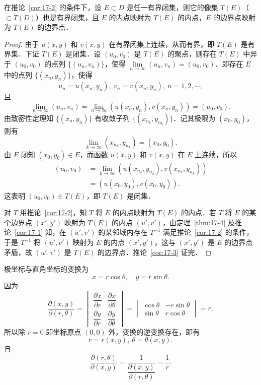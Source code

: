 \begin{corollary}\label{cor:17-3}
在推论~\ref{cor:17-2} 的条件下，设 $E\subset D$ 是任一有界闭集，则它的像集 $T(E)$（$\subset T(D)$）也是有界闭集，且 $E$ 的内点映射为 $T(E)$ 的内点，$E$ 的边界点映射为 $T(E)$ 的边界点．
\end{corollary}

\begin{proof}
由于 $u(x,y)$ 和 $v(x,y)$ 在有界闭集上连续，从而有界，即 $T(E)$ 是有界集．下证 $T(E)$ 是闭集．设 $(u_{0},v_{0})$ 是 $T(E)$ 的聚点，则存在 $T(E)$ 中异于 $(u_{0},v_{0})$ 的点列 $\{(u_{n},v_{n})\}$，使得 $\lim\limits_{n\to\infty}(u_{n},v_{n})=(u_{0},v_{0})$．即存在 $E$ 中的点列 $\{(x_{n},y_{n})\}$，使得
\[
u_{n}=u(x_{n},y_{n}),\ v_{n}=v(x_{n},y_{n}),\ n=1,2,\cdots,
\]
且
\[
\lim_{n\to\infty}(u_{n},v_{n})=\lim_{n\to\infty}\left(u(x_{n},y_{n}),v(x_{n},y_{n})\right)=(u_{0},v_{0}).
\]
由致密性定理知 $\{(x_{n},y_{n})\}$ 有收敛子列 $\{(x_{n_{k}},y_{n_{k}})\}$．记其极限为 $(x_{0},y_{0})$，则有
\[
\lim_{k\to\infty}(x_{n_{k}},y_{n_{k}})=(x_{0},y_{0}).
\]
由 $E$ 闭知 $(x_{0},y_{0})\in E$，而函数 $u(x,y)$ 和 $v(x,y)$ 在 $E$ 上连续，所以
\[
\begin{aligned}
(u_{0},v_{0})&=\lim_{k\to\infty}\left(u(x_{n_{k}},y_{n_{k}}),v(x_{n_{k}},y_{n_{k}})\right)\\
&=\left(u(x_{0},y_{0}),v(x_{0},y_{0})\right).
\end{aligned}
\]
这表明 $(u_{0},v_{0})\in T(E)$，即 $T(E)$ 是闭集．

对 $T$ 用推论~\ref{cor:17-2}，知 $T$ 将 $E$ 的内点映射为 $T(E)$ 的内点．若 $T$ 将 $E$ 的某个边界点 $(x',y')$ 映射为 $T(E)$ 的内点 $(u',v')$，由定理~\ref{thm:17-4} 及推论~\ref{cor:17-1} 知，在 $(u',v')$ 的某邻域内存在 $T^{-1}$ 满足推论~\ref{cor:17-2} 的条件，于是 $T^{-1}$ 将 $(u',v')$ 映射为 $E$ 的内点 $(x',y')$，这与 $(x',y')$ 是 $E$ 的边界点矛盾，故 $(u',v')$ 是 $T(E)$ 的边界点．推论~\ref{cor:17-3} 证完．
\end{proof}

\begin{example}\label{ex:17-2-2}
极坐标与直角坐标的变换为
\[
x=r\cos\theta,\quad y=r\sin\theta.
\]
因为
\[
\frac{\partial(x,y)}{\partial(r,\theta)}=\begin{vmatrix}\dfrac{\partial x}{\partial r}&\dfrac{\partial x}{\partial\theta}\\[8pt]\dfrac{\partial y}{\partial r}&\dfrac{\partial y}{\partial\theta}\end{vmatrix}=\begin{vmatrix}\cos\theta&-r\sin\theta\\ \sin\theta&r\cos\theta\end{vmatrix}=r,
\]
所以除 $r=0$ 即坐标原点 $(0,0)$ 外，变换的逆变换存在，即有
\[
r=r(x,y),\ \theta=\theta(x,y).
\]
且
\[
\frac{\partial(r,\theta)}{\partial(x,y)}=\frac{1}{\dfrac{\partial(x,y)}{\partial(r,\theta)}}=\frac{1}{r}.
\]
\end{example}

